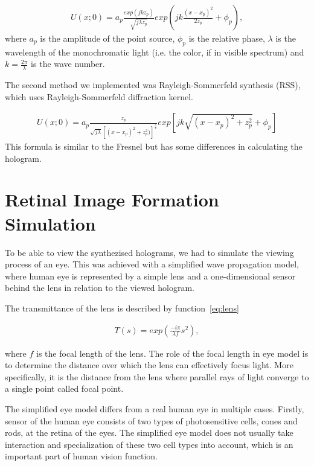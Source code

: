\documentclass[12pt,a4paper,english
]{tunithesis}
\begin{document}
\begin{align}
  \label{eq:fresnel}
  U(x;0) = a_p\frac{exp(j k z_p)}{\sqrt{j \lambda z_p}}exp(jk\frac{(x-x_p)^2}{2z_p}+\phi_p),
\end{align}
where $a_p$ is the amplitude of the point source, $\phi_p$ is the relative phase, $\lambda$ is the wavelength of the monochromatic light (i.e. the color, if in visible spectrum) and $k = \frac{2\pi}{\lambda}$ is the wave number.

The second method we implemented was Rayleigh-Sommerfeld synthesis (RSS), which uses Rayleigh-Sommerfeld diffraction kernel. 

\begin{align}
  \label{eq:rss}
  U(x;0) = a_p\frac{z_p}{\sqrt{j \lambda}[(x-x_p)^2+z_p^2)]^\frac{3}{4}}exp[jk\sqrt{(x-x_p)^2+z_p^2}+\phi_p]
\end{align}
This formula is similar to the Fresnel but has some differences in calculating the hologram. 

\section{Retinal Image Formation Simulation}
To be able to view the synthezised holograms, we had to simulate the viewing process of an eye. This was achieved with a simplified wave propagation model, where human eye is represented by a simple lens and a one-dimensional sensor behind the lens in relation to the viewed hologram.

The transmittance of the lens is described by function~\ref{eq:lens}

\begin{align}
  \label{eq:lens}
  T(s) = exp(\frac{-i\pi}{\lambda f}s^2),
\end{align}

where $f$ is the focal length of the lens. The role of the focal length in eye model is to determine the distance over which the lens can effectively focus light. More specifically, it is the distance from the lens where parallel rays of light converge to a single point called focal point.

The simplified eye model differs from a real human eye in multiple cases. Firstly, sensor of the human eye consists of two types of photosensitive cells, cones and rods, at the retina of the eyes. The simplified eye model does not usually take interaction and specialization of these two cell types into account, which is an important part of human vision function.
\end{document}
